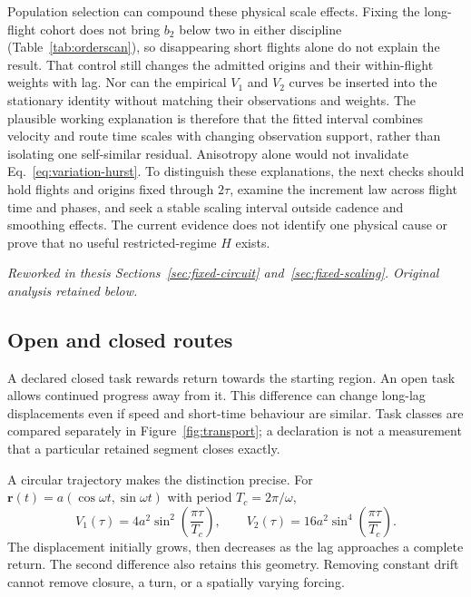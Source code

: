 Population selection can compound these physical scale effects. Fixing the
long-flight cohort does not bring $b_2$ below two in either discipline
(Table~\ref{tab:orderscan}), so disappearing short flights alone do not explain
the result. That control still changes the admitted origins and their within-flight
weights with lag. Nor can the empirical $V_1$ and $V_2$ curves be inserted into
the stationary identity without matching their observations and weights.
The plausible working explanation is therefore that the fitted interval combines
velocity and route time scales with changing observation support, rather than
isolating one self-similar residual. Anisotropy alone would not invalidate
Eq.~\eqref{eq:variation-hurst}. To distinguish these explanations, the next
checks should hold flights and origins fixed through $2\tau$, examine the
increment law across flight time and phases, and seek a stable scaling interval
outside cadence and smoothing effects. The current evidence does not identify
one physical cause or prove that no useful restricted-regime $H$ exists.

\begingroup\color{red!70!black}
\noindent\textit{Reworked in thesis Sections~\ref{sec:fixed-circuit} and~\ref{sec:fixed-scaling}. Original analysis retained below.}\par
\subsection{Open and closed routes}
\label{sec:strata-compat}

A declared closed task rewards return towards the starting region. An open task allows
continued progress away from it. This difference can change long-lag displacements even
if speed and short-time behaviour are similar. Task classes are compared separately in
Figure~\ref{fig:transport}; a declaration is not a measurement that a particular retained
segment closes exactly.

A circular trajectory makes the distinction precise. For
$\mathbf r(t)=a(\cos\omega t,\sin\omega t)$ with period $T_c=2\pi/\omega$,
\begin{equation}
  V_1(\tau)=4a^2\sin^2\!\left(\frac{\pi\tau}{T_c}\right),\qquad
  V_2(\tau)=16a^2\sin^4\!\left(\frac{\pi\tau}{T_c}\right).
  \label{eq:closed-circle}
\end{equation}
The displacement initially grows, then decreases as the lag approaches a complete return.
The second difference also retains this geometry. Removing constant drift cannot remove
closure, a turn, or a spatially varying forcing.

